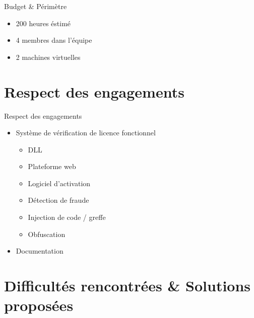 \documentclass{cubeamer}
\begin{document}
\begin{frame}{Budget \& Périmètre}
    \begin{itemize}
        \item 200 heures éstimé
        \item 4 membres dans l'équipe
        \item 2 machines virtuelles
      \end{itemize}
\end{frame}


\section{Respect des engagements}

\begin{frame}{Respect des engagements}
    \begin{itemize}
        \item Système de vérification de licence fonctionnel
        \begin{itemize}
        \item DLL
        \item Plateforme web
        \item Logiciel d'activation
        \item Détection de fraude
        \item Injection de code / greffe 
        \item Obfuscation
        \end{itemize}
        \item Documentation
    \end{itemize}
\end{frame}

\section{Difficultés rencontrées \& Solutions proposées}
\end{document}
